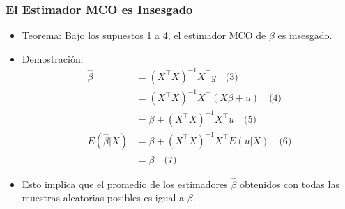 \documentclass{beamer}
\begin{document}
\begin{frame}
\frametitle{El Estimador MCO es Insesgado}
\begin{itemize}
    \item Teorema: Bajo los supuestos 1 a 4, el estimador MCO de $\beta$ es insesgado.
    \item Demostración:
    \begin{align*}
        \hat{\beta} &= (X^{\top}X)^{-1}X^{\top}y \quad \text{(3)} \\
        &= (X^{\top}X)^{-1}X^{\top}(X\beta + u) \quad \text{(4)} \\
        &= \beta + (X^{\top}X)^{-1}X^{\top}u \quad \text{(5)} \\
        E(\hat{\beta}|X) &= \beta + (X^{\top}X)^{-1}X^{\top}E(u|X) \quad \text{(6)} \\
        &= \beta \quad \text{(7)}
    \end{align*}
    \item Esto implica que el promedio de los estimadores $\hat{\beta}$ obtenidos con todas las muestras aleatorias posibles es igual a $\beta$.
\end{itemize}
\end{frame}
\end{document}
